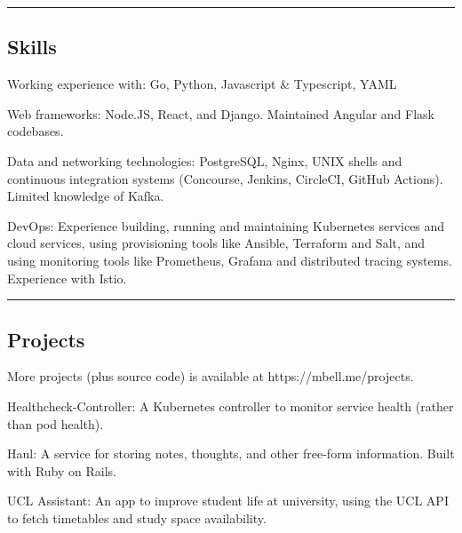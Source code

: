 \documentclass[11pt,a4paper]{article}
\newenvironment{indentsection}[1]%
{\begin{list}{}%
	{\setlength{\leftmargin}{#1}}%
	\item[]%
}
{\end{list}}
\begin{document}
\vspace{-0.4em}
\hrule
\vspace{-1.2em}

\subsection*{Skills}

\begin{indentsection}{\parindent}
\begin{description*}
	\item[Working experience with:]
	    Go, Python, Javascript \& Typescript, YAML
	\item[Web frameworks:]
	    Node.JS, React, and Django. Maintained Angular and Flask codebases.
	\item[Data and networking technologies:]
	    PostgreSQL, Nginx, UNIX shells and continuous integration systems (Concourse, Jenkins, CircleCI, GitHub Actions). Limited knowledge of Kafka.
	\item[DevOps:]
	    Experience building, running and maintaining Kubernetes
            services and cloud services, using provisioning tools like Ansible,
            Terraform and Salt, and using monitoring tools like Prometheus, Grafana
            and distributed tracing systems. Experience with Istio.
\end{description*}
\end{indentsection}

\vspace{-0.4em}
\hrule

\vspace{-1.2em}
\subsection*{Projects}
\begin{indentsection}{\parindent}
	More projects (plus source code) is available at https://mbell.me/projects.
	\begin{description*}
		\item[Healthcheck-Controller:] A Kubernetes controller to monitor service health (rather than pod health).
		\item[Haul:] A service for storing notes, thoughts, and other free-form information. Built with Ruby on Rails.
		\item[UCL Assistant:] An app to improve student life at university, using the UCL API to fetch timetables and study space availability.
	\end{description*}
\end{indentsection}
\end{document}

